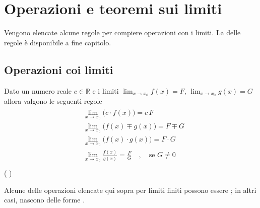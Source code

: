 \documentclass[letterpaper,10pt,italian]{jupyterBook}
\begin{document}
\section{Operazioni e teoremi sui limiti}
\label{\detokenize{ch/infinitesimal_calculus/analysis:operazioni-e-teoremi-sui-limiti}}\label{\detokenize{ch/infinitesimal_calculus/analysis:infinitesimal-calculus-limits-thms}}
\sphinxAtStartPar
Vengono elencate alcune regole per compiere operazioni con i limiti. La {\hyperref[\detokenize{ch/infinitesimal_calculus/analysis-notes:infinitesimal-calculus-limits-thms-notes}]{}} delle regole è disponibile a fine capitolo.


\subsection{Operazioni coi limiti}
\label{\detokenize{ch/infinitesimal_calculus/analysis:operazioni-coi-limiti}}\label{\detokenize{ch/infinitesimal_calculus/analysis:infinitesimal-calculus-limits-thms-operations}}
\sphinxAtStartPar
Dato un numero reale \(c \in \mathbb{R}\) e i limiti  \(\lim_{x \rightarrow x_0} f(x) = F\), \(\lim_{x \rightarrow x_0} g(x) = G\) allora valgono le seguenti regole
\begin{equation*}
\begin{split}\begin{aligned}
 & \lim_{x \rightarrow x_0} \big( c \cdot f(x) \big) = c \, F  \\
 & \lim_{x \rightarrow x_0} \big( f(x) \mp g(x) \big) = F \mp G \\
 & \lim_{x \rightarrow x_0} \big( f(x) \cdot g(x) \big) = F \cdot G \\
 & \lim_{x \rightarrow x_0} \frac{ f(x) }{ g(x) } = \frac{F}{G} \quad , \quad \text{se $G \ne 0$}  \\
\end{aligned}\end{split}
\end{equation*}
\sphinxAtStartPar
( )

\sphinxAtStartPar
Alcune delle operazioni elencate qui sopra per limiti finiti possono essere {\hyperref[\detokenize{ch/infinitesimal_calculus/analysis:infinitesimal-calculus-limits-thms-infinite-simal}]{}}; in altri casi, nascono delle forme {\hyperref[\detokenize{ch/infinitesimal_calculus/analysis:infinitesimal-calculus-limits-thms-infinite-simal-undetermined}]{}}.
\end{document}
